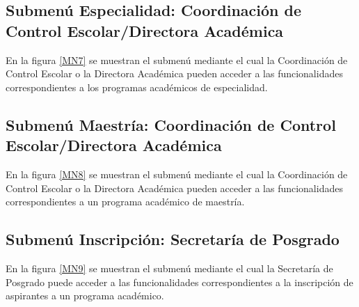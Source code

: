 \hypertarget{submenu:CCE-MenuEspecialidad}{}	
\subsection{Submenú Especialidad: Coordinación de Control Escolar/Directora Académica}
En la figura \ref{MN7} se muestran el submenú mediante el cual la Coordinación de Control Escolar o la Directora Académica pueden acceder a las funcionalidades correspondientes a los programas académicos de especialidad.

\hypertarget{submenu:CCE-MenuMaestria}{}	
\subsection{Submenú Maestría: Coordinación de Control Escolar/Directora Académica}
En la figura \ref{MN8} se muestran el submenú mediante el cual la Coordinación de Control Escolar o la Directora Académica pueden acceder a las funcionalidades correspondientes a un programa académico de maestría.

\hypertarget{submenu:SP-Inscripcion}{}	
\subsection{Submenú Inscripción: Secretaría de Posgrado}
En la figura \ref{MN9} se muestran el submenú mediante el cual la Secretaría de Posgrado puede acceder a las funcionalidades correspondientes a la inscripción de aspirantes a un programa académico.
